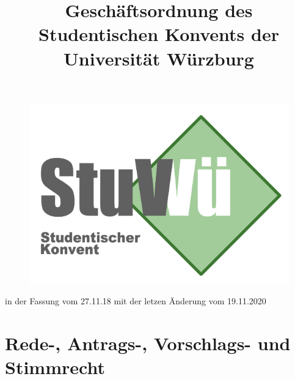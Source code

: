 \documentclass[10pt,a4paper]{scrartcl}
\title{\LARGE Geschäftsordnung des Studentischen Konvents der Universität Würzburg}
\date{}
\begin{document}
\maketitle

\begin{figure}[h]
	\includegraphics[width=\textwidth]{logo.png}
\end{figure}


\vspace{2cm}

{\centering \Large \sffamily in der Fassung vom 27.11.18 mit der letzen Änderung vom 19.11.2020}

\pagebreak

\setcounter{tocdepth}{4}
\tableofcontents

\pagebreak


\section{Rede-, Antrags-, Vorschlags- und
Stimmrecht}\label{rede--antrags--vorschlags--und-stimmrecht}
\end{document}
